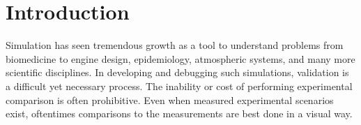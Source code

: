 
\section{Introduction}








Simulation has seen tremendous growth as a tool to understand problems
from biomedicine to engine design, epidemiology, atmospheric systems,
and many more scientific disciplines. In developing and debugging
such simulations, validation is a difficult yet necessary process.
The inability or cost of performing experimental comparison is often
prohibitive.  Even when measured experimental scenarios exist,
oftentimes comparisons to the measurements are best done in a visual
way.

